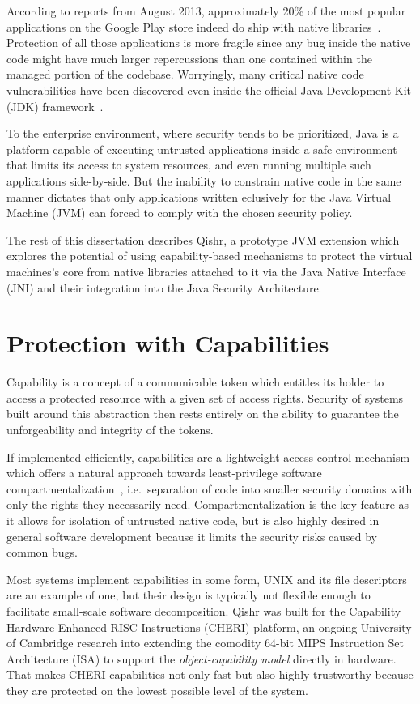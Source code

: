 \documentclass[a4paper,12pt,twoside,openright]{report}
\begin{document}
According to reports from August 2013, approximately 20\% of the most popular applications on the Google Play store indeed do ship with native libraries~\cite{poeplau2014execute}. Protection of all those applications is more fragile since any bug inside the native code might have much larger repercussions than one contained within the managed portion of the codebase. Worryingly, many critical native code vulnerabilities have been discovered even inside the official Java Development Kit (JDK) framework~\cite{Tan:2008:ESS:1496711.1496736}. 

To the enterprise environment, where security tends to be prioritized, Java is a platform capable of executing untrusted applications inside a safe environment that limits its access to system resources, and even running multiple such applications side-by-side. But the inability to constrain native code in the same manner dictates that only applications written eclusively for the Java Virtual Machine (JVM) can forced to comply with the chosen security policy.

The rest of this dissertation describes Qishr, a prototype JVM extension which explores the potential of using capability-based mechanisms to protect the virtual machines's core from native libraries attached to it via the Java Native Interface (JNI) and their integration into the Java Security Architecture.

\section{Protection with Capabilities}

Capability is a concept of a communicable token which entitles its holder to access a protected resource with a given set of access rights. Security of systems built around this abstraction then rests entirely on the ability to guarantee the unforgeability and integrity of the tokens.

If implemented efficiently, capabilities are a lightweight access control mechanism which offers a natural approach towards least-privilege software compartmentalization~\cite{Watson:2010:CPC:1929820.1929824}, i.e.\ separation of code into smaller security domains with only the rights they necessarily need. Compartmentalization is the key feature as it allows for isolation of untrusted native code, but is also highly desired in general software development because it limits the security risks caused by common bugs.

Most systems implement capabilities in some form, UNIX and its file descriptors are an example of one, but their design is typically not flexible enough to facilitate small-scale software decomposition. Qishr was built for the Capability Hardware Enhanced RISC Instructions (CHERI) platform, an ongoing University of Cambridge research into extending the comodity 64-bit MIPS Instruction Set Architecture (ISA) to support the \emph{object-capability model} directly in hardware. That makes CHERI capabilities not only fast but also highly trustworthy because they are protected on the lowest possible level of the system.
\end{document}
